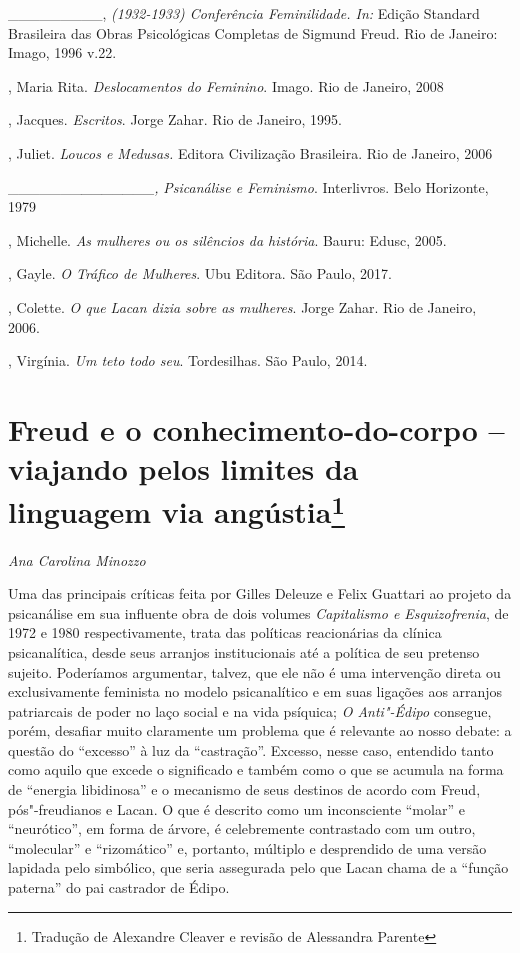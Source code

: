 \_\_\_\_\_\_\_\_\_, \emph{(1932-1933) Conferência  Feminilidade.
In:} Edição Standard Brasileira das Obras Psicológicas Completas de
Sigmund Freud. Rio de Janeiro: Imago, 1996 v.22.

, Maria Rita. \emph{Deslocamentos do Feminino}. Imago. Rio de
Janeiro, 2008

, Jacques. \emph{Escritos}. Jorge Zahar. Rio de Janeiro, 1995.

, Juliet. \emph{Loucos e Medusas.} Editora Civilização
Brasileira. Rio de Janeiro, 2006

\_\_\_\_\_\_\_\emph{\_\_\_\_\_\_\_,} \emph{Psicanálise e Feminismo}.
Interlivros. Belo Horizonte, 1979

, Michelle. \emph{As mulheres ou os silêncios da história}. Bauru:
Edusc, 2005.

, Gayle. \emph{O Tráfico de Mulheres}. Ubu Editora. São Paulo,
2017.

, Colette. \emph{O que Lacan dizia sobre as mulheres}. Jorge Zahar.
Rio de Janeiro, 2006.

, Virgínia. \emph{Um teto todo seu}. Tordesilhas. São Paulo, 2014.

\chapter*{Freud e o conhecimento-do-corpo -- viajando pelos limites da
linguagem via angústia\footnote{Tradução de Alexandre Cleaver e revisão
  de Alessandra Parente}}

\begin{flushright}
\emph{Ana Carolina Minozzo}
\end{flushright}

Uma das principais críticas feita por Gilles Deleuze e Felix Guattari ao
projeto da psicanálise em sua influente obra de dois volumes
\emph{Capitalismo e Esquizofrenia}, de 1972 e 1980 respectivamente,
trata das políticas reacionárias da clínica psicanalítica, desde seus
arranjos institucionais até a política de seu pretenso sujeito.
Poderíamos argumentar, talvez, que ele não é uma intervenção direta ou
exclusivamente feminista no modelo psicanalítico e em suas ligações aos
arranjos patriarcais de poder no laço social e na vida psíquica;
\emph{O Anti"-Édipo} consegue, porém, desafiar muito claramente um
problema que é relevante ao nosso debate: a questão do ``excesso'' à luz
da ``castração''. Excesso, nesse caso, entendido tanto como aquilo que
excede o significado e também como o que se acumula na forma de
``energia libidinosa'' e o mecanismo de seus destinos de acordo com
Freud, pós"-freudianos e Lacan. O que é descrito como um inconsciente
``molar'' e ``neurótico'', em forma de árvore, é celebremente
contrastado com um outro, ``molecular'' e ``rizomático'' e, portanto,
múltiplo e desprendido de uma versão lapidada pelo simbólico, que seria
assegurada pelo que Lacan chama de a ``função paterna'' do pai castrador
de Édipo.

